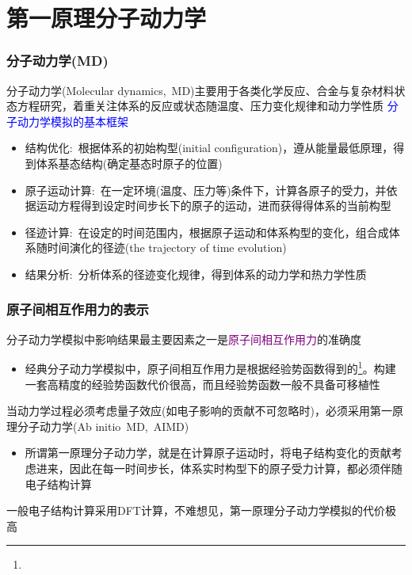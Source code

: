 \section{第一原理分子动力学}
\frame
{
	\frametitle{分子动力学\textrm{(MD)}}
	分子动力学\textrm{(Molecular dynamics,~MD)}主要用于各类化学反应、合金与复杂材料状态方程研究，着重关注体系的反应或状态随温度、压力变化规律和动力学性质
\vskip 5pt
\textcolor{blue}{分子动力学模拟的基本框架}
	\begin{itemize}
		\item 结构优化:~根据体系的初始构型\textrm{(initial configuration)}，遵从能量最低原理，得到体系基态结构(确定基态时原子的位置)
		\item 原子运动计算:~在一定环境(温度、压力等)条件下，计算各原子的受力，并依据运动方程得到设定时间步长下的原子的运动，进而获得得体系的当前构型
		\item 径迹计算:~在设定的时间范围内，根据原子运动和体系构型的变化，组合成体系随时间演化的径迹\textrm{(the trajectory of time evolution)}
		\item 结果分析:~分析体系的径迹变化规律，得到体系的动力学和热力学性质
	\end{itemize}
}

\frame
{
	\frametitle{原子间相互作用力的表示}
	分子动力学模拟中影响结果最主要因素之一是\textcolor{purple}{原子间相互作用力}的准确度
\vskip 5pt
\begin{itemize}
	\item 经典分子动力学模拟中，原子间相互作用力是根据经验势函数得到的\footnote{\fontsize{6.2pt}{4.2pt}\selectfont{经验势函数也称为力场，是参数化形式给出的原子间相互作用，一般通过对实验数据拟合或小体系的第一原理计算得到}}。构建一套高精度的经验势函数代价很高，而且经验势函数一般不具备可移植性
\end{itemize}
\vskip 5pt
	当动力学过程必须考虑量子效应(如电子影响的贡献不可忽略时)，必须采用第一原理分子动力学\textrm{(Ab initio~MD,~AIMD)}
	\begin{itemize}
		\item 所谓第一原理分子动力学，就是在计算原子运动时，将电子结构变化的贡献考虑进来，因此在每一时间步长，体系实时构型下的原子受力计算，都必须伴随电子结构计算
	\end{itemize}
	一般电子结构计算采用\textrm{DFT}计算，不难想见，第一原理分子动力学模拟的代价极高
}

